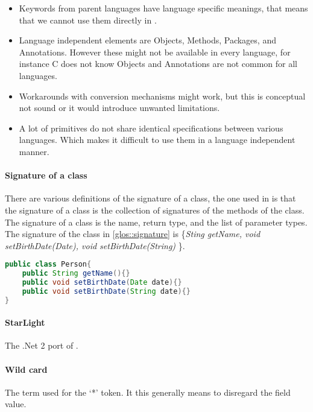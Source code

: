 \begin{itemize}[noitemsep]
\item Keywords from parent languages have language specific meanings, that means that we cannot use them
directly in \Compose*{}.
\item Language independent elements are Objects, Methods, Packages, and Annotations. However these
might not be available in every language, for instance C does not know Objects and Annotations are not common for all
languages.
\item Workarounds with conversion mechanisms might work, but this is conceptual not sound or it would introduce unwanted limitations.
\item A lot of primitives do not share identical specifications between various languages. Which makes it difficult to use them in a language independent manner.
\end{itemize}

\paragraph{Signature of a class} There are various definitions of the signature of a class, the one used in \Compose* is
that the signature of a class is the collection of signatures of the methods of the class. The signature of a class
is the name, return type, and the list of parameter types. The signature of the class in \autoref{glos::signature}
is \{\emph{Sting getName, void setBirthDate(Date), void setBirthDate(String)} \}.

\begin{lstlisting}[caption={Example class in Java},label=glos::signature,float=h,language=Java,style=listing]
public class Person{
	public String getName(){}
	public void setBirthDate(Date date){}
	public void setBirthDate(String date){}
}
\end{lstlisting}

\paragraph{StarLight} The .Net 2 port of \Compose*.

\paragraph{Wild card} The term used for the `*' token. It \Compose* this generally means to disregard the field value.
